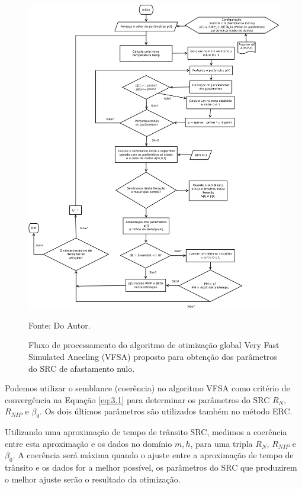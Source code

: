 \begin{figure}[htb]
\caption{Fluxo de processamento do algoritmo de otimização global Very Fast Simulated Aneeling (VFSA)
proposto para obtenção dos parâmetros do SRC de afastamento nulo.}
\begin{center}
\includegraphics[scale=0.45]{images/VFSA.png}
\vspace{-0.3cm}
\end{center}
\begin{center}
 Fonte: Do Autor.
\end{center}
\label{fig:3.1}
\end{figure}

Podemos utilizar o semblance (coerência) no algoritmo VFSA como critério de convergência na Equação \ref{eq:3.1}
para determinar os parâmetros do SRC $R_N$, $R_{NIP}$ e $\beta_0$. Os dois últimos parâmetros são utilizados também 
no método ERC.

Utilizando uma aproximação de tempo de trânsito SRC, medimos a coerência entre esta aproximação e os
dados no domínio $m, h$, para uma tripla $R_N$, $R_{NIP}$ e $\beta_0$.
A coerência será máxima quando o ajuste entre a aproximação de tempo de trânsito e os dados
for a melhor possível, os parâmetros do SRC que produzirem o melhor ajuste serão o resultado da otimização.

